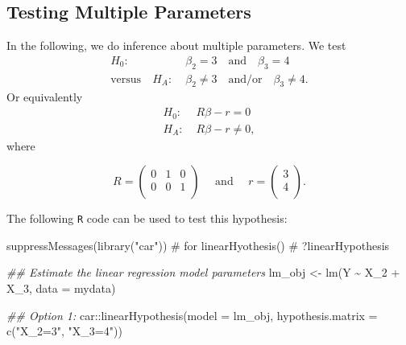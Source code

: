 \documentclass[
  letterpaper,
  DIV=11,
  numbers=noendperiod]{scrreprt}
\newenvironment{Shaded}{\begin{snugshade}}{\end{snugshade}}
\newcommand{\AttributeTok}[1]{\textcolor[rgb]{0.40,0.45,0.13}{#1}}
\newcommand{\CommentTok}[1]{\textcolor[rgb]{0.37,0.37,0.37}{#1}}
\newcommand{\DocumentationTok}[1]{\textcolor[rgb]{0.37,0.37,0.37}{\textit{#1}}}
\newcommand{\FunctionTok}[1]{\textcolor[rgb]{0.28,0.35,0.67}{#1}}
\newcommand{\NormalTok}[1]{\textcolor[rgb]{0.00,0.23,0.31}{#1}}
\newcommand{\OtherTok}[1]{\textcolor[rgb]{0.00,0.23,0.31}{#1}}
\newcommand{\SpecialCharTok}[1]{\textcolor[rgb]{0.37,0.37,0.37}{#1}}
\newcommand{\StringTok}[1]{\textcolor[rgb]{0.13,0.47,0.30}{#1}}
\theoremstyle{definition}
\theoremstyle{plain}
\theoremstyle{plain}
\theoremstyle{remark}
\begin{document}
\hypertarget{testing-multiple-parameters}{%
\subsection{Testing Multiple
Parameters}\label{testing-multiple-parameters}}

In the following, we do inference about multiple parameters. We test
\begin{align*}
H_0:\;&\beta_2=3\quad\text{and}\quad\beta_3=4\\
\text{versus}\quad H_A:\;&\beta_2\neq 3\quad\text{and/or}\quad\beta_3\neq 4.
\end{align*} Or equivalently \begin{align*}
H_0:\;&R\beta -r = 0 \\
H_A:\;&R\beta -r \neq 0,
\end{align*} where

\[
R=\left(
\begin{matrix}
0&1&0\\
0&0&1\\
\end{matrix}\right)\quad\text{ and }\quad 
r=\left(\begin{matrix}3\\4\\\end{matrix}\right).
\]

The following \texttt{R} code can be used to test this hypothesis:

\begin{Shaded}
\begin{Highlighting}[]
\FunctionTok{suppressMessages}\NormalTok{(}\FunctionTok{library}\NormalTok{(}\StringTok{"car"}\NormalTok{)) }\CommentTok{\# for linearHyothesis()}
\CommentTok{\# ?linearHypothesis}

\DocumentationTok{\#\# Estimate the linear regression model parameters}
\NormalTok{lm\_obj }\OtherTok{\textless{}{-}} \FunctionTok{lm}\NormalTok{(Y }\SpecialCharTok{\textasciitilde{}}\NormalTok{ X\_2 }\SpecialCharTok{+}\NormalTok{ X\_3, }\AttributeTok{data =}\NormalTok{ mydata)}

\DocumentationTok{\#\# Option 1:}
\NormalTok{car}\SpecialCharTok{::}\FunctionTok{linearHypothesis}\NormalTok{(}\AttributeTok{model =}\NormalTok{ lm\_obj, }
                      \AttributeTok{hypothesis.matrix =} \FunctionTok{c}\NormalTok{(}\StringTok{"X\_2=3"}\NormalTok{, }\StringTok{"X\_3=4"}\NormalTok{))}
\end{Highlighting}
\end{Shaded}
\end{document}
